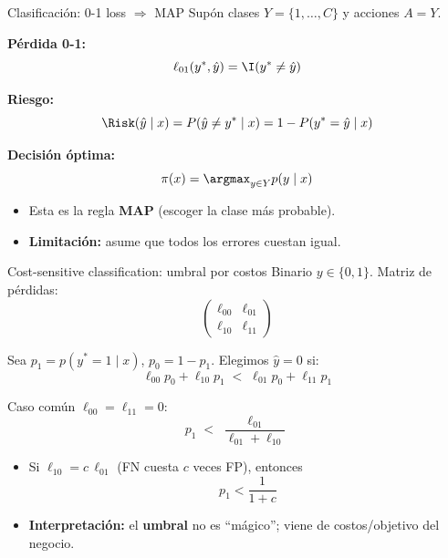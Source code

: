 \begin{frame}{Clasificación: 0-1 loss \(\Rightarrow\) MAP}
Supón clases \(Y=\{1,\dots,C\}\) y acciones \(A=Y\).

\textbf{Pérdida 0-1:}
\[
\ell_{01}(y^*,\hat y)=\I(y^*\neq \hat y)
\]

\textbf{Riesgo:}
\[
\Risk(\hat y\mid x)=P(\hat y\neq y^*\mid x)=1-P(y^*=\hat y\mid x)
\]

\textbf{Decisión óptima:}
\[
\pi(x)=\argmax_{y\in Y} p(y\mid x)
\]
\begin{itemize}
  \item Esta es la regla \textbf{MAP} (escoger la clase más probable).
  \item \textbf{Limitación:} asume que todos los errores cuestan igual.
\end{itemize}
\end{frame}

\begin{frame}{Cost-sensitive classification: umbral por costos}
Binario \(y\in\{0,1\}\). Matriz de pérdidas:
\[
\begin{pmatrix}
\ell_{00} & \ell_{01}\\
\ell_{10} & \ell_{11}
\end{pmatrix}
\]

Sea \(p_1=p(y^*=1\mid x)\), \(p_0=1-p_1\).
Elegimos \(\hat y=0\) si:
\[
\ell_{00}p_0+\ell_{10}p_1 \;<\; \ell_{01}p_0+\ell_{11}p_1
\]

Caso común \(\ell_{00}=\ell_{11}=0\):
\[
 p_1 \;<\; \frac{\ell_{01}}{\ell_{01}+\ell_{10}}
\]

\begin{itemize}
  \item Si \(\ell_{10}=c\,\ell_{01}\) (FN cuesta \(c\) veces FP), entonces
  \[
  p_1 < \frac{1}{1+c}
  \]
  \item \textbf{Interpretación:} el \textbf{umbral} no es “mágico”; viene de costos/objetivo del negocio.
\end{itemize}
\end{frame}

